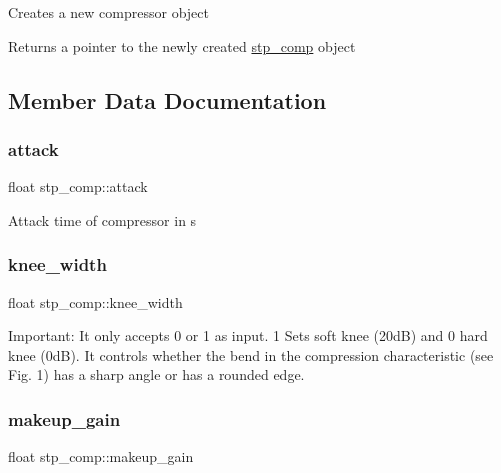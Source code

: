 Creates a new compressor object~\newline
 

\begin{DoxyReturn}{Returns}
a pointer to the newly created \mbox{\hyperlink{structstp__comp}{stp\+\_\+comp}} object ~\newline
 
\end{DoxyReturn}


\subsection{Member Data Documentation}
\mbox{\label{structstp__comp_a8a102a4737ae2985fceb43130b74d0d6}} 
\subsubsection{\texorpdfstring{attack}{attack}}
{\footnotesize\ttfamily float stp\+\_\+comp\+::attack}

Attack time of compressor in s \mbox{\label{structstp__comp_af76f213eccad338ea25159cf33cf1836}} 
\subsubsection{\texorpdfstring{knee\+\_\+width}{knee\_width}}
{\footnotesize\ttfamily float stp\+\_\+comp\+::knee\+\_\+width}

Important\+: It only accepts 0 or 1 as input. 1 Sets soft knee (20dB) and 0 hard knee (0dB). It controls whether the bend in the compression characteristic (see Fig. 1) has a sharp angle or has a rounded edge. \mbox{\label{structstp__comp_a1b05876761b61dbd892522db342e0164}} 
\subsubsection{\texorpdfstring{makeup\+\_\+gain}{makeup\_gain}}
{\footnotesize\ttfamily float stp\+\_\+comp\+::makeup\+\_\+gain}


